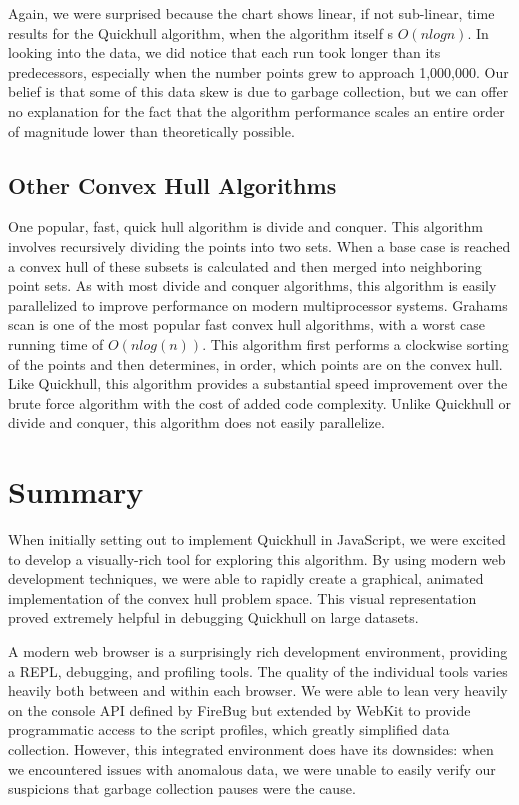 \documentclass[11pt]{article}
\begin{document}
Again, we were surprised because the chart shows linear, if not sub-linear, time results for the Quickhull algorithm, when the algorithm itself s $O(n log n)$. In looking into the data, we did notice that each run took longer than its predecessors, especially when the number points grew to approach 1,000,000. Our belief is that some of this data skew is due to garbage collection, but we can offer no explanation for the fact that the algorithm performance scales an entire order of magnitude lower than theoretically possible.

\subsection{Other Convex Hull Algorithms}
One popular, fast, quick hull algorithm is divide and conquer. This algorithm involves recursively dividing the points into two sets. When a base case is reached a convex hull of these subsets is calculated and then merged into neighboring point sets. As with most divide and conquer algorithms, this algorithm is easily parallelized to improve performance on modern multiprocessor systems.
Grahams scan is one of the most popular fast convex hull algorithms, with a worst case running time of $O(nlog(n))$. This algorithm first performs a clockwise sorting of the points and then determines, in order, which points are on the convex hull. Like Quickhull, this algorithm provides a substantial speed improvement over the brute force algorithm with the cost of added code complexity. Unlike Quickhull or divide and conquer, this algorithm does not easily parallelize.
\section{Summary}
When initially setting out to implement Quickhull in JavaScript, we were excited to develop a visually-rich tool for exploring this algorithm. By using modern web development techniques, we were able to rapidly create a graphical, animated implementation of the convex hull problem space. This visual representation proved extremely helpful in debugging Quickhull on large datasets.

A modern web browser is a surprisingly rich development environment, providing a REPL, debugging, and profiling tools. The quality of the individual tools varies heavily both between and within each browser. We were able to lean very heavily on the console API defined by FireBug but extended by WebKit to provide programmatic access to the script profiles, which greatly simplified data collection. However, this integrated environment does have its downsides: when we encountered issues with anomalous data, we were unable to easily verify our suspicions that garbage collection pauses were the cause.
\end{document}
